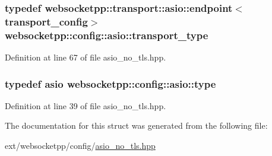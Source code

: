 \subsubsection[{transport\+\_\+type}]{\setlength{\rightskip}{0pt plus 5cm}typedef {\bf websocketpp\+::transport\+::asio\+::endpoint}$<${\bf transport\+\_\+config}$>$ {\bf websocketpp\+::config\+::asio\+::transport\+\_\+type}}\label{structwebsocketpp_1_1config_1_1asio_af600118e4ba565fa6e5063490e9e7047}


Definition at line 67 of file asio\+\_\+no\+\_\+tls.\+hpp.

\hypertarget{structwebsocketpp_1_1config_1_1asio_a14c6f9da27b459266c165df5f40e4ba1}{}
\subsubsection[{type}]{\setlength{\rightskip}{0pt plus 5cm}typedef {\bf asio} {\bf websocketpp\+::config\+::asio\+::type}}\label{structwebsocketpp_1_1config_1_1asio_a14c6f9da27b459266c165df5f40e4ba1}


Definition at line 39 of file asio\+\_\+no\+\_\+tls.\+hpp.



The documentation for this struct was generated from the following file\+:\begin{DoxyCompactItemize}
\item 
ext/websocketpp/config/\hyperlink{asio__no__tls_8hpp}{asio\+\_\+no\+\_\+tls.\+hpp}\end{DoxyCompactItemize}
